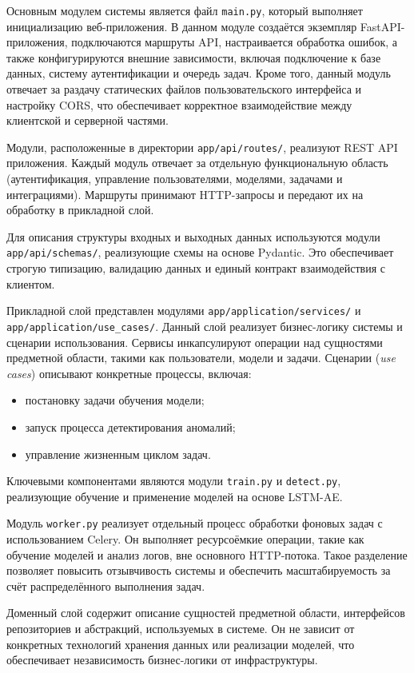 Основным модулем системы является файл \texttt{main.py}, который выполняет инициализацию веб-приложения. В данном модуле создаётся экземпляр FastAPI-приложения, подключаются маршруты API, настраивается обработка ошибок, а также конфигурируются внешние зависимости, включая подключение к базе данных, систему аутентификации и очередь задач. Кроме того, данный модуль отвечает за раздачу статических файлов пользовательского интерфейса и настройку CORS, что обеспечивает корректное взаимодействие между клиентской и серверной частями.


Модули, расположенные в директории \texttt{app/api/routes/}, реализуют REST API приложения. Каждый модуль отвечает за отдельную функциональную область (аутентификация, управление пользователями, моделями, задачами и интеграциями). Маршруты принимают HTTP-запросы и передают их на обработку в прикладной слой.

Для описания структуры входных и выходных данных используются модули \texttt{app/api/schemas/}, реализующие схемы на основе Pydantic. Это обеспечивает строгую типизацию, валидацию данных и единый контракт взаимодействия с клиентом.

Прикладной слой представлен модулями \texttt{app/application/services/} и \texttt{app/application/use\_cases/}. Данный слой реализует бизнес-логику системы и сценарии использования. Сервисы инкапсулируют операции над сущностями предметной области, такими как пользователи, модели и задачи. Сценарии (\textit{use cases}) описывают конкретные процессы, включая:

\begin{itemize}
    \item постановку задачи обучения модели;
    \item запуск процесса детектирования аномалий;
    \item управление жизненным циклом задач.
\end{itemize}

Ключевыми компонентами являются модули \texttt{train.py} и \texttt{detect.py}, реализующие обучение и применение моделей на основе LSTM-AE.

Модуль \texttt{worker.py} реализует отдельный процесс обработки фоновых задач с использованием Celery. Он выполняет ресурсоёмкие операции, такие как обучение моделей и анализ логов, вне основного HTTP-потока. Такое разделение позволяет повысить отзывчивость системы и обеспечить масштабируемость за счёт распределённого выполнения задач.

Доменный слой содержит описание сущностей предметной области, интерфейсов репозиториев и абстракций, используемых в системе. Он не зависит от конкретных технологий хранения данных или реализации моделей, что обеспечивает независимость бизнес-логики от инфраструктуры.

